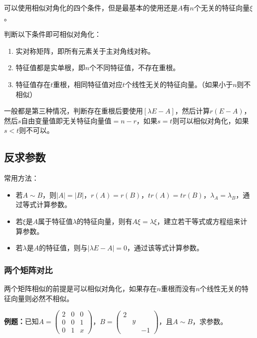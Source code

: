 \documentclass[UTF8, 12pt]{ctexart}
\begin{document}
可以使用相似对角化的四个条件，但是最基本的使用还是$A$有$n$个无关的特征向量$\xi$。

判断以下条件即可相似对角化：

\begin{enumerate}
    \item 实对称矩阵，即所有元素关于主对角线对称。
    \item 特征值都是实单根，即$n$个不同特征值，不存在重根。
    \item 特征值存在$t$重根，相同特征值对应$t$个线性无关的特征向量。（如果小于$n$则不相似）
\end{enumerate}

一般都是第三种情况，判断存在重根后要使用$[\lambda E-A]$，然后计算$r(E-A)$，然后$s$自由变量值即无关特征向量值$=n-r$，如果$s=t$则可以相似对角化，如果$s<t$则不可以。

\subsection{反求参数}

常用方法：

\begin{itemize}
    \item 若$A\sim B$，则$\vert A\vert=\vert B\vert$，$r(A)=r(B)$，$tr(A)=tr(B)$，$\lambda_A=\lambda_B$，通过等式计算参数。
    \item 若$\xi$是$A$属于特征值$\lambda$的特征向量，则有$A\xi=\lambda\xi$，建立若干等式或方程组来计算参数。
    \item 若$\lambda$是$A$的特征值，则与$\vert\lambda E-A\vert=0$，通过该等式计算参数。
\end{itemize}

\subsubsection{两个矩阵对比}

两个矩阵相似的前提是可以相似对角化，如果存在$n$重根而没有$n$个线性无关的特征向量则必然不相似。

\textbf{例题：}已知$A=\left(\begin{array}{ccc}
    2 & 0 & 0 \\
    0 & 0 & 1 \\
    0 & 1 & x
\end{array}\right)$，$B=\left(\begin{array}{ccc}
    2 \\
     & y \\
     & & -1
\end{array}\right)$，且$A\sim B$，求参数。\medskip
\end{document}
